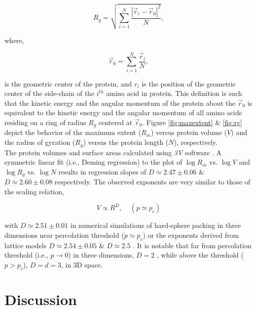 \documentclass[11pt]{article}
\begin{document}
    \begin{equation}
        \label{eqn:rg}
        R_g = \sqrt{\sum_{i=1}^N \frac{|\vec r_i-\vec r_0|^2}{N}},
    \end{equation}

    \noindent where,

    \begin{equation}
        \label{eqn:com}
        \vec r_0 = \sum_{i=1}^N \frac{\vec r_i}{N},
    \end{equation}

    \noindent is the geometric center of the protein, and $r_i$ is the position of the geometric center of the side-chain of the $i^{th}$ amino acid in protein. This definition is such that the kinetic energy and the angular momentum of the protein about the $\vec r_0$ is equivalent to the kinetic energy and the angular momentum of all amino acids residing on a ring of radius $R_g$ centered at $\vec r_0$. Figure \ref{fig:maxextent} \& \ref{fig:rg} depict the behavior of the maximum extent ($R_m$) versus protein volume ($V$) and the radius of gyration ($R_g$) versus the protein length ($N$), respectively. \\



    The protein volumes and surface areas calculated using {\it 3V} software \cite{voss_3v:_2010}. A symmetric linear fit (i.e., Deming regression) to the plot of $\log R_m$ vs. $\log V$ and $\log R_g$ vs. $\log N$ results in regression slopes of $D\simeq2.47\pm0.06$ \& $D\simeq2.60\pm0.08$ respectively. The observed exponents are very similar to those of the scaling relation,

    \begin{equation}
        V \propto R^{D}, ~~~~~ (p\simeq p_c)
    \end {equation}

    \noindent with $D\simeq2.51\pm0.01$ in numerical simulations of hard-sphere packing \cite{lorenz_universality_1993} in three dimensions near percolation threshold ($p\simeq p_c$) or the exponents derived from lattice models $D\simeq2.54\pm0.05$ \cite{adler_series_1990} \& $D\simeq2.5$ \cite{stauffer_introduction_1994}. It is notable that far from percolation threshold (i.e., $p\rightarrow 0$) in three dimensions, $D=2$ \cite{parisi_critical_1981}, while above the threshold ($p>p_c$), $D=d=3$, in 3D space.

\section{Discussion}
\label{sec:discussion}
\end{document}
